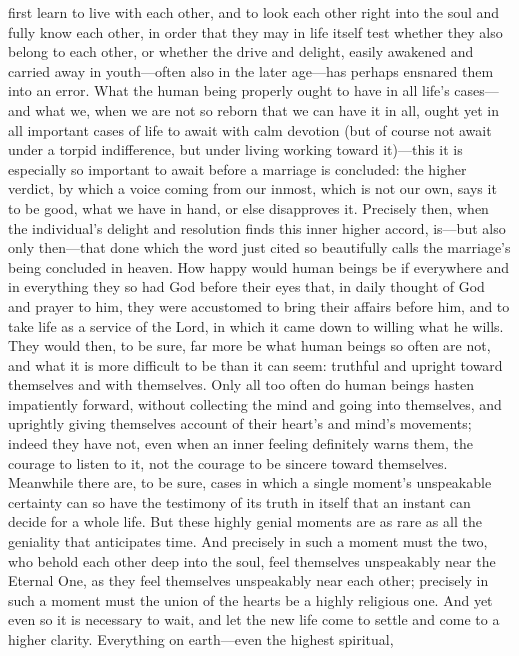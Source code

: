 \documentclass[12pt,a4paper]{book}
\begin{document}
first learn to live with each other, and to look each other right into the
soul and fully know each other, in order that they may in life itself test
whether they also belong to each other, or whether the drive and delight,
easily awakened and carried away in youth---often also in the later
age---has perhaps ensnared them into an error.
What the human being properly ought to have in all life's cases---and what
we, when we are not so reborn that we can have it in all, ought yet in all
important cases of life to await with calm devotion (but of course not
await under a torpid indifference, but under living working toward
it)---this it is especially so important to await before a marriage is
concluded: the higher verdict, by which a voice coming from our inmost,
which is not our own, says it to be good, what we have in hand, or else
disapproves it. Precisely then, when the individual's delight and
resolution finds this inner higher accord, is---but also only then---that
done which the word just cited so beautifully calls the marriage's being
concluded in heaven. How happy would human beings be if everywhere and in
everything they so had God before their eyes that, in daily thought of God
and prayer to him, they were accustomed to bring their affairs before him,
and to take life as a service of the Lord, in which it came down to willing
what he wills. They would then, to be sure, far more be what human beings
so often are not, and what it is more difficult to be than it can seem:
truthful and upright toward themselves and with themselves. Only all too
often do human beings hasten impatiently forward, without collecting the
mind and going into themselves, and uprightly giving themselves account of
their heart's and mind's movements; indeed they have not, even when an
inner feeling definitely warns them, the courage to listen to it, not the
courage to be sincere toward themselves. Meanwhile there are, to be sure,
cases in which a single moment's unspeakable certainty can so have the
testimony of its truth in itself that an instant can decide for a whole
life. But these highly genial moments are as rare as all the geniality that
anticipates time. And precisely in such a moment must the two, who behold
each other deep into the soul, feel themselves unspeakably near the Eternal
One, as they feel themselves unspeakably near each other; precisely in such
a moment must the union of the hearts be a highly religious one. And yet
even so it is necessary to wait, and let the new life come to settle and
come to a higher clarity. Everything on earth---even the highest spiritual,
\end{document}
